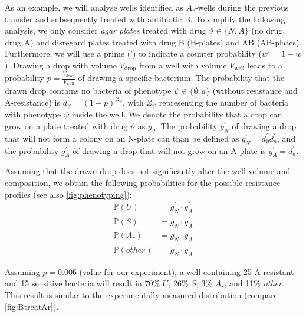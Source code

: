 As an example, we will analyse wells identified as \( A_r \)-wells during the previous transfer and subsequently treated with antibiotic B. 
To simplify the following analysis, we only consider \textit{agar plates} treated with drug  $\vartheta \in \{N, A\}$ (no drug, drug A)  and disregard plates treated with drug B (B-plates) and AB (AB-plates). 
Furthermore, we will use a prime (') to indicate a counter probability ($w' = 1-w$).
Drawing a drop with volume \( V_{\text{drop}} \) from a well with volume \( V_{\text{well}} \) leads to a probability \( p = \frac{V_{\text{drop}}}{V_{\text{well}}} \) of drawing a specific bacterium. 
The probability that the drawn drop contains no bacteria of phenotype  \( \psi \in \{\emptyset, a\}\) (without resistance and A-resistance)  is \( d_\psi^\prime = (1-p)^{Z_\psi} \), with \( Z_\psi \) representing the number of bacteria with phenotype \( \psi\)  inside the well. 
We denote the probability that a drop can grow on a plate treated with drug $\vartheta$ as $g_\vartheta$.
The probability $g_N^\prime$ of drawing a drop that will not form a colony on an N-plate can than be defined as \( g_N^\prime = d^\prime_\emptyset d^\prime_a \), and the probability \( g_A^\prime \) of drawing a drop that will not grow on an A-plate is \( g_A^\prime = d^\prime_a \).

Assuming that the drawn drop does not significantly alter the well volume and composition, we obtain the following probabilities for the possible resistance profiles (see also \autoref{fig:phenotyping}):
\begin{align*}
    \mathbb{P}(U) &= g_N^\prime \cdot g_A^\prime \\
    \mathbb{P}(S) &= g_N \cdot g_A^\prime \\
    \mathbb{P}(A_r) &= g_N \cdot g_A \\
    \mathbb{P}(other) &= g_N^\prime \cdot g_A 
\end{align*}

Assuming \( p = 0.006 \) (value for our experiment), a well containing 25 A-resistant and 15 sensitive bacteria will result in 70\% \( U \), 26\% \( S \), 3\% \( A_r \), and 11\% \textit{other}. 
This result is similar to the experimentally measured distribution (compare \autoref{fig:BtreatAr}).

